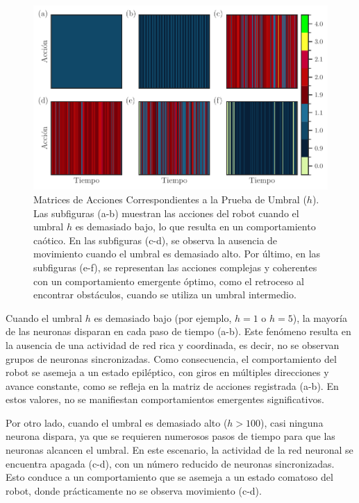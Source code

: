 \begin{figure}[h!]
	\centering\includegraphics[width=\imsize]{accion_umbrales.pdf}
	\caption[ Matrices de Acciones Correspondientes a la Prueba de Umbral ($h$).]{ Matrices de Acciones Correspondientes a la Prueba de Umbral ($h$). Las subfiguras (a-b) muestran las acciones del robot cuando el umbral $h$ es demasiado bajo, lo que resulta en un comportamiento caótico. En las subfiguras (c-d), se observa la ausencia de movimiento cuando el umbral es demasiado alto. Por último, en las subfiguras (e-f), se representan las acciones complejas y coherentes con un comportamiento emergente óptimo, como el retroceso al encontrar obstáculos, cuando se utiliza un umbral intermedio. }\label{fig:accion_umbrales}
\end{figure}





Cuando el umbral $h$ es demasiado bajo (por ejemplo, $h=1$ o $h=5$), la mayoría de las neuronas disparan en cada paso de tiempo (a-b). Este fenómeno resulta en la ausencia de una actividad de red rica y coordinada, es decir, no se observan grupos de neuronas sincronizadas. Como consecuencia, el comportamiento del robot se asemeja a un estado epiléptico, con giros en múltiples direcciones y avance constante, como se refleja en la matriz de acciones registrada (a-b). En estos valores, no se manifiestan comportamientos emergentes significativos.

Por otro lado, cuando el umbral es demasiado alto ($h>100$), casi ninguna neurona dispara, ya que se requieren numerosos pasos de tiempo para que las neuronas alcancen el umbral. En este escenario, la actividad de la red neuronal se encuentra apagada (c-d), con un número reducido de neuronas sincronizadas. Esto conduce a un comportamiento que se asemeja a un estado comatoso del robot, donde prácticamente no se observa movimiento (c-d).

